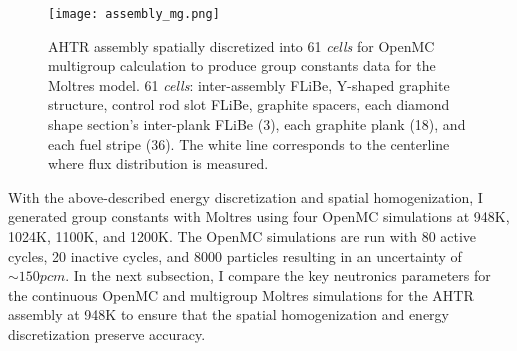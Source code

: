 \begin{figure}[htbp]
    \centering
    \texttt{[image: assembly\_mg.png]}
    \raggedright
    \caption{\acrfull{AHTR} assembly spatially discretized into 
    61 \textit{cells} for OpenMC multigroup calculation to produce group constants 
    data for the Moltres model.
    61 \textit{cells}: inter-assembly \gls{FLiBe}, Y-shaped graphite structure, control 
    rod slot \gls{FLiBe}, graphite spacers, each diamond shape section's inter-plank 
    \gls{FLiBe} (3), each graphite plank (18), and each fuel stripe (36).
     The white line corresponds to the centerline where flux distribution is measured.}
    \label{fig:assembly_mg}
\end{figure}

With the above-described energy discretization and spatial homogenization, I generated 
group constants with Moltres using four OpenMC simulations at 948K, 1024K, 1100K, and 
1200K. 
The OpenMC simulations are run with 80 active cycles, 20 inactive cycles, and 8000 
particles resulting in an uncertainty of $\sim 150pcm$.
In the next subsection, I compare the key neutronics parameters for the continuous 
OpenMC and multigroup Moltres simulations for the \gls{AHTR} assembly at 948K to 
ensure that the spatial homogenization and energy discretization preserve accuracy. 

